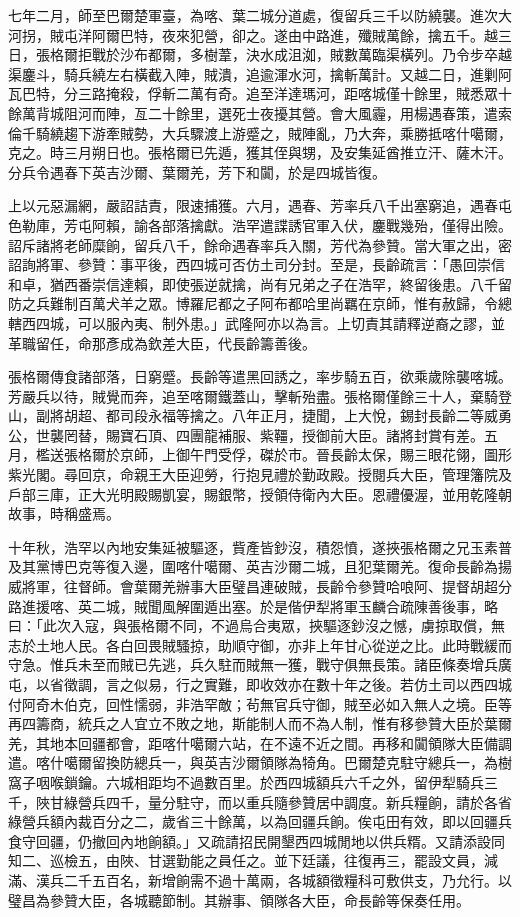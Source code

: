\begin{pinyinscope}
七年二月，師至巴爾楚軍臺，為喀、葉二城分道處，復留兵三千以防繞襲。進次大河拐，賊屯洋阿爾巴特，夜來犯營，卻之。遂由中路進，殲賊萬餘，擒五千。越三日，張格爾拒戰於沙布都爾，多樹葦，決水成沮洳，賊數萬臨渠橫列。乃令步卒越渠鏖斗，騎兵繞左右橫截入陣，賊潰，追逾渾水河，擒斬萬計。又越二日，進剿阿瓦巴特，分三路掩殺，俘斬二萬有奇。追至洋達瑪河，距喀城僅十餘里，賊悉眾十餘萬背城阻河而陣，亙二十餘里，選死士夜擾其營。會大風霾，用楊遇春策，遣索倫千騎繞趨下游牽賊勢，大兵驟渡上游蹙之，賊陣亂，乃大奔，乘勝抵喀什噶爾，克之。時三月朔日也。張格爾已先遁，獲其侄與甥，及安集延酋推立汗、薩木汗。分兵令遇春下英吉沙爾、葉爾羌，芳下和闐，於是四城皆復。

上以元惡漏網，嚴詔詰責，限速捕獲。六月，遇春、芳率兵八千出塞窮追，遇春屯色勒庫，芳屯阿賴，諭各部落擒獻。浩罕遣諜誘官軍入伏，鏖戰幾殆，僅得出險。詔斥諸將老師糜餉，留兵八千，餘命遇春率兵入關，芳代為參贊。當大軍之出，密詔詢將軍、參贊：事平後，西四城可否仿土司分封。至是，長齡疏言：「愚回崇信和卓，猶西番崇信達賴，即使張逆就擒，尚有兄弟之子在浩罕，終留後患。八千留防之兵難制百萬犬羊之眾。博羅尼都之子阿布都哈里尚羈在京師，惟有赦歸，令總轄西四城，可以服內夷、制外患。」武隆阿亦以為言。上切責其請釋逆裔之謬，並革職留任，命那彥成為欽差大臣，代長齡籌善後。

張格爾傳食諸部落，日窮蹙。長齡等遣黑回誘之，率步騎五百，欲乘歲除襲喀城。芳嚴兵以待，賊覺而奔，追至喀爾鐵蓋山，擊斬殆盡。張格爾僅餘三十人，棄騎登山，副將胡超、都司段永福等擒之。八年正月，捷聞，上大悅，錫封長齡二等威勇公，世襲罔替，賜寶石頂、四團龍補服、紫韁，授御前大臣。諸將封賞有差。五月，檻送張格爾於京師，上御午門受俘，磔於市。晉長齡太保，賜三眼花翎，圖形紫光閣。尋回京，命親王大臣迎勞，行抱見禮於勤政殿。授閱兵大臣，管理籓院及戶部三庫，正大光明殿賜凱宴，賜銀幣，授領侍衛內大臣。恩禮優渥，並用乾隆朝故事，時稱盛焉。

十年秋，浩罕以內地安集延被驅逐，貲產皆鈔沒，積怨憤，遂挾張格爾之兄玉素普及其黨博巴克等復入邊，圍喀什噶爾、英吉沙爾二城，且犯葉爾羌。復命長齡為揚威將軍，往督師。會葉爾羌辦事大臣璧昌連破賊，長齡令參贊哈哴阿、提督胡超分路進援喀、英二城，賊聞風解圍遁出塞。於是偕伊犁將軍玉麟合疏陳善後事，略曰：「此次入寇，與張格爾不同，不過烏合夷眾，挾驅逐鈔沒之憾，虜掠取償，無志於土地人民。各白回畏賊騷掠，助順守御，亦非上年甘心從逆之比。此時戰緩而守急。惟兵未至而賊已先逃，兵久駐而賊無一獲，戰守俱無長策。諸臣條奏增兵廣屯，以省徵調，言之似易，行之實難，即收效亦在數十年之後。若仿土司以西四城付阿奇木伯克，回性懦弱，非浩罕敵；茍無官兵守御，賊至必如入無人之境。臣等再四籌商，統兵之人宜立不敗之地，斯能制人而不為人制，惟有移參贊大臣於葉爾羌，其地本回疆都會，距喀什噶爾六站，在不遠不近之間。再移和闐領隊大臣備調遣。喀什噶爾留換防總兵一，與英吉沙爾領隊為犄角。巴爾楚克駐守總兵一，為樹窩子咽喉鎖鑰。六城相距均不過數百里。於西四城額兵六千之外，留伊犁騎兵三千，陜甘綠營兵四千，量分駐守，而以重兵隨參贊居中調度。新兵糧餉，請於各省綠營兵額內裁百分之二，歲省三十餘萬，以為回疆兵餉。俟屯田有效，即以回疆兵食守回疆，仍撤回內地餉額。」又疏請招民開墾西四城閒地以供兵糈。又請添設同知二、巡檢五，由陜、甘選勤能之員任之。並下廷議，往復再三，罷設文員，減滿、漢兵二千五百名，新增餉需不過十萬兩，各城額徵糧科可敷供支，乃允行。以璧昌為參贊大臣，各城聽節制。其辦事、領隊各大臣，命長齡等保奏任用。


\end{pinyinscope}
